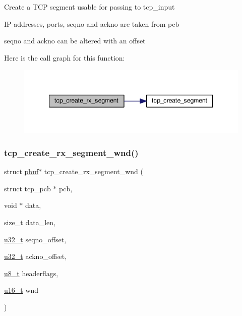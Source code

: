 Create a T\+CP segment usable for passing to tcp\+\_\+input
\begin{DoxyItemize}
\item I\+P-\/addresses, ports, seqno and ackno are taken from pcb
\item seqno and ackno can be altered with an offset 
\end{DoxyItemize}Here is the call graph for this function\+:
\nopagebreak
\begin{figure}[H]
\begin{center}
\leavevmode
\includegraphics[width=340pt]{openmote-cc2538_2lwip_2test_2unit_2tcp_2tcp__helper_8c_a53b3207c8e960cdad9af044b0606a55b_cgraph}
\end{center}
\end{figure}
\mbox{\label{openmote-cc2538_2lwip_2test_2unit_2tcp_2tcp__helper_8c_aa45bbb22d0e973f9af6732ac35faed68}} 
\subsubsection{\texorpdfstring{tcp\+\_\+create\+\_\+rx\+\_\+segment\+\_\+wnd()}{tcp\_create\_rx\_segment\_wnd()}}
{\footnotesize\ttfamily struct \hyperlink{structpbuf}{pbuf}$\ast$ tcp\+\_\+create\+\_\+rx\+\_\+segment\+\_\+wnd (\begin{DoxyParamCaption}\item[{struct tcp\+\_\+pcb $\ast$}]{pcb,  }\item[{void $\ast$}]{data,  }\item[{size\+\_\+t}]{data\+\_\+len,  }\item[{\hyperlink{group__compiler__abstraction_ga4c14294869aceba3ef9d4c0c302d0f33}{u32\+\_\+t}}]{seqno\+\_\+offset,  }\item[{\hyperlink{group__compiler__abstraction_ga4c14294869aceba3ef9d4c0c302d0f33}{u32\+\_\+t}}]{ackno\+\_\+offset,  }\item[{\hyperlink{group__compiler__abstraction_ga4caecabca98b43919dd11be1c0d4cd8e}{u8\+\_\+t}}]{headerflags,  }\item[{\hyperlink{group__compiler__abstraction_ga77570ac4fcab86864fa1916e55676da2}{u16\+\_\+t}}]{wnd }\end{DoxyParamCaption})}

